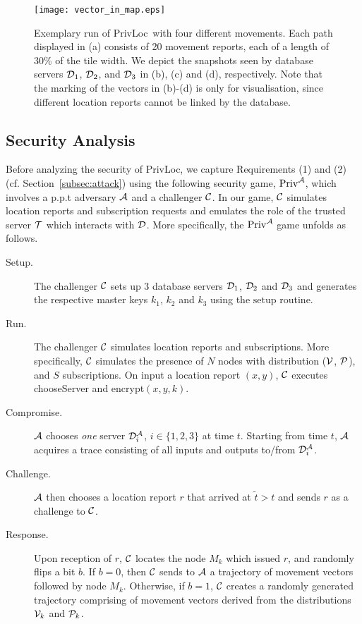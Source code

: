 \documentclass{llncs}
\newcommand\sol{{\sf PrivLoc}}
\begin{document}
\begin{figure}[tb]
	\centering
		\texttt{[image: vector\_in\_map.eps]}
		\caption{Exemplary run of {\sol}~with four different movements. Each path displayed in (a) consists of 20 movement reports, each of a length of 30\% of the tile width. We depict the snapshots seen by database servers ${\cal D}_1$, ${\cal D}_2$, and ${\cal D}_3$ in (b), (c) and (d), respectively. Note that the marking of the vectors in (b)-(d) is only for visualisation, since different location reports cannot be linked by the database. }
	\label{fig:example}
\end{figure}


\subsection{Security Analysis}\label{subsec:def}

Before analyzing the security of \sol, we capture Requirements (1) and (2) (cf. Section~\ref{subsec:attack}) using the following security game, $\mathrm{Priv}^{\cal A}$, which involves a p.p.t adversary ${\cal A}$ and a
challenger $\cal C$. In our game, $\cal C$ simulates location reports and subscription requests and emulates the role of the trusted server ${\cal T}$ which interacts with $\cal D$. More specifically, the $\mathrm{Priv}^{{\cal A}}$ game unfolds as follows.
\begin{description}
\item [Setup.] The challenger ${\cal C}$ sets up 3 database servers ${\cal D}_1$, ${\cal D}_2$ and ${\cal D}_3$ and generates the respective master keys $k_1$, $k_2$ and $k_3$ using the $\mathrm{setup}$ routine.
\item [Run.] The challenger ${\cal C}$ simulates location reports and subscriptions. More specifically, $\cal C$ simulates the presence of $N$ nodes with distribution ($\cal V$, $\cal P$), and $S$ subscriptions.
On input a location report $(x,y)$, $\cal C$ executes {\sf chooseServer} and {\sf encrypt}$(x,y,k)$.
\item [Compromise.] ${\cal A}$ chooses \emph{one} server ${\cal D}^{{\cal A}}_i$, $i \in \{1,2,3\}$ at time $t$.
Starting from time $t$, ${\cal A}$ acquires a trace consisting of all inputs and outputs to/from ${\cal D}^{{\cal A}}_i$.
\item [Challenge.] ${\cal A}$ then chooses a location report $r$ that arrived at $\tilde{t} > t$ and sends $r$ as a challenge to $\cal C$.
\item [Response.] Upon reception of $r$, $\cal C$ locates the node $M_k$ which issued $r$, and randomly flips a bit $b$. If $b=0$, then $\cal C$ sends to ${\cal A}$ a trajectory of movement vectors followed by node $M_k$.
Otherwise, if $b=1$, $\cal C$ creates a randomly generated trajectory comprising of movement vectors derived from the distributions ${\cal V}_k$ and ${\cal P}_k$.
\end{description}
\end{document}
